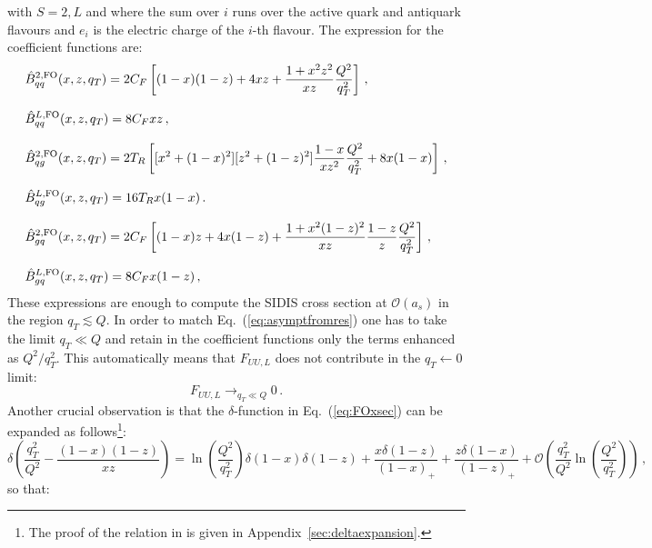 \documentclass[10pt,a4paper]{article}
\begin{document}
with $S=2,L$ and where the sum over $i$ runs over the active quark and
antiquark flavours and $e_i$ is the electric charge of the $i$-th
flavour. The expression for the coefficient functions are:
\begin{equation}\label{eq:Bacchettaetal}
\begin{array}{l}
\displaystyle \hat{B}_{qq}^{2,\rm FO}(x,z,q_T) = 2C_F\left[(1-x)(1-z)+4xz+\frac{1+x^2z^2}{xz}\frac{Q^2}{q_T^2}\right]\,,\\
\\
\displaystyle \hat{B}_{qq}^{L,\rm FO}(x,z,q_T) = 8C_Fxz\,,\\
\\
\displaystyle \hat{B}_{qg}^{2,\rm FO}(x,z,q_T) = 2T_R\left[[x^2+(1-x)^2][z^2+(1-z)^2]\frac{1-x}{xz^2}\frac{Q^2}{q_T^2} +8x(1-x)\right]\,,\\
\\
\displaystyle \hat{B}_{qg}^{L,\rm FO}(x,z,q_T) = 16T_Rx(1-x)\,.\\
\\
\displaystyle \hat{B}_{gq}^{2,\rm FO}(x,z,q_T) = 2C_F\left[(1-x)z+4x(1-z)+\frac{1+x^2(1-z)^2}{xz}\frac{1-z}{z}\frac{Q^2}{q_T^2}\right]\,,\\
\\
\displaystyle \hat{B}_{gq}^{L,\rm FO}(x,z,q_T) = 8C_Fx(1-z)\,,
\end{array}
\end{equation}
These expressions are enough to compute the SIDIS cross section at
$\mathcal{O}(a_s)$ in the region $q_T \lesssim Q$. In order to match
Eq.~(\ref{eq:asymptfromres}) one has to take the limit $q_T\ll Q$ and
retain in the coefficient functions only the terms enhanced as
$Q^2/q_T^2$. This automatically means that $F_{UU,L}$ does not
contribute in the $q_T\leftarrow 0$ limit:
\begin{equation}
F_{UU,L}\mathop{\longrightarrow}_{q_T\ll Q} 0\,.
\end{equation}
Another crucial observation is that the $\delta$-function in
Eq.~(\ref{eq:FOxsec}) can be expanded as follows\footnote{The proof of
  the relation in is given in Appendix~\ref{sec:deltaexpansion}.}:
\begin{equation}\label{eq:deltaexpansion}
  \delta\left(\frac{q_T^2}{Q^2}-\frac{(1-x)(1-z)}{xz}\right)
  =\ln\left(\frac{Q^2}{q_T^2}\right)\delta(1-x) \delta(1-z) +
  \frac{x\delta(1-z)}{(1-x)_+}+ \frac{z\delta(1-x)}{(1-z)_+} +\mathcal{O}\left(\frac{q_T^2}{Q^2}\ln\left(\frac{Q^2}{q_T^2}\right)\right)\,,
\end{equation}
so that:
\end{document}
